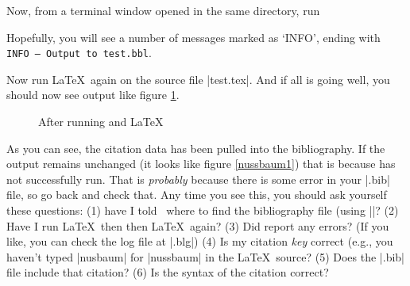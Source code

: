 Now, from a terminal window opened in the same directory, run

Hopefully, you will see a number of messages marked as `INFO', ending
with \texttt{INFO -- Output to test.bbl}.

Now run \LaTeX\ again on the source file |test.tex|. And if all is
going well, you should now see output like figure \ref{nussbaum2}.

\begin{figure}
\caption{After running  and \LaTeX}\label{nussbaum2}
\end{figure}

As you can see, the citation data has been pulled into the
bibliography. If the output remains unchanged (it looks like figure
\ref{nussbaum1}) that is because  has not successfully
run. That is \emph{probably} because there is some error in your
|.bib| file, so go back and check that. Any time you see this, you
should ask yourself these
questions: (1) have I told \biblatex\ where
to find the bibliography file (using ||? (2) Have I
run \LaTeX\ then  then \LaTeX\ again? (3) Did
 report any errors? (If you like, you can check the log file at
|.blg|) (4) Is my citation \emph{key} correct (e.g.,
you haven't typed |nusbaum| for |nussbaum| in the \LaTeX\ source? (5)
Does the |.bib| file include that citation? (6) Is the syntax of the
citation correct?


